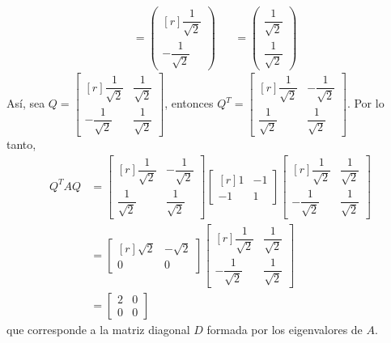 \begin{example}
\begin{align*}
        & = \begin{pmatrix*}[r]
            \dfrac{1}{\sqrt{2}} \\[3mm]
            -\dfrac{1}{\sqrt{2}}
        \end{pmatrix*} & & = \begin{pmatrix}
            \dfrac{1}{\sqrt{2}} \\[3mm]
            \dfrac{1}{\sqrt{2}}
        \end{pmatrix}
    \end{align*}
    Así, sea $Q = \begin{bmatrix*}[r]
        \dfrac{1}{\sqrt{2}} & \dfrac{1}{\sqrt{2}} \\[3mm]
        -\dfrac{1}{\sqrt{2}} & \dfrac{1}{\sqrt{2}}
    \end{bmatrix*}$, entonces $Q^T = \begin{bmatrix*}[r]
        \dfrac{1}{\sqrt{2}} & - \dfrac{1}{\sqrt{2}} \\[3mm]
        \dfrac{1}{\sqrt{2}} & \dfrac{1}{\sqrt{2}}
    \end{bmatrix*}$. Por lo tanto,
    \begin{align*}
        Q^TAQ & = \begin{bmatrix*}[r]
            \dfrac{1}{\sqrt{2}} & - \dfrac{1}{\sqrt{2}} \\[3mm]
            \dfrac{1}{\sqrt{2}} & \dfrac{1}{\sqrt{2}}
        \end{bmatrix*} \begin{bmatrix*}[r]
            1 & -1 \\
            -1 & 1
        \end{bmatrix*} \begin{bmatrix*}[r]
            \dfrac{1}{\sqrt{2}} & \dfrac{1}{\sqrt{2}} \\[3mm]
            -\dfrac{1}{\sqrt{2}} & \dfrac{1}{\sqrt{2}}
        \end{bmatrix*} \\
        & = \begin{bmatrix*}[r]
            \sqrt{2} & -\sqrt{2} \\
            0 & 0
        \end{bmatrix*} \begin{bmatrix*}[r]
            \dfrac{1}{\sqrt{2}} & \dfrac{1}{\sqrt{2}} \\[3mm]
            -\dfrac{1}{\sqrt{2}} & \dfrac{1}{\sqrt{2}}
        \end{bmatrix*} \\
        & = \begin{bmatrix}
            2 & 0 \\
            0 & 0
        \end{bmatrix}
    \end{align*}
    que corresponde a la matriz diagonal $D$ formada por los eigenvalores de $A$.
\end{example}

